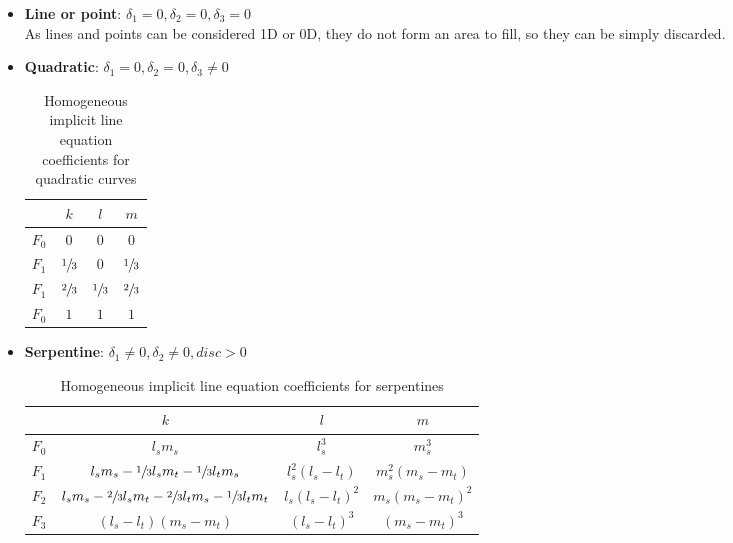 \documentclass[\topdir/main.tex]{subfiles}
\begin{document}
\begin{itemize}
    \item \textbf{Line or point}: $\delta_1 = 0, \delta_2 = 0, \delta_3 = 0$\\
        As lines and points can be considered 1D or 0D, they do not form an area to fill, so they can be simply discarded. 
    
    \item \textbf{Quadratic}: $\delta_1 = 0, \delta_2 = 0, \delta_3 \neq 0$\\
        \begin{table}[H]
            \centering
            \begin{tabular}{|l|c|c|c|}
                \hline
                \qquad&     $k$ &               $l$ &               $m$             \\\hline
                $F_0$ &     $0$ &               $0$ &               $0$             \\\hline
                $F_1$ &     $\sfrac{1}{3}$ &    $0$ &               $\sfrac{1}{3}$  \\\hline
                $F_1$ &     $\sfrac{2}{3}$ &    $\sfrac{1}{3}$ &    $\sfrac{2}{3}$  \\\hline
                $F_0$ &     $1$ &               $1$ &               $1$             \\\hline
            \end{tabular}
            \caption{Homogeneous implicit line equation coefficients for quadratic curves}
            \label{tab:blinnloop_klm_quadratic}
        \end{table}
    
    \item \textbf{Serpentine}: $\delta_1 \neq 0, \delta_2 \neq 0, disc > 0$
        \begin{table}[H]
            \centering
            \begin{tabular}{|l|c|c|c|}
                \hline
                \qquad&     $k$ &               $l$ &               $m$ \\\hline
                $F_0$ &     $l_s m_s$ &         $l_s^3$ &           $m_s^3$ \\\hline
                $F_1$ &     $l_s m_s - \sfrac{1}{3} l_s m_t - \sfrac{1}{3} l_t m_s$ &       
                            $l_s^2 (l_s - l_t)$ &         
                            $m_s^2 (m_s - m_t)$ \\\hline
                $F_2$ &     $l_s m_s - \sfrac{2}{3} l_s m_t - \sfrac{2}{3} l_t m_s - \sfrac{1}{3} l_t m_t$ &
                            $l_s (l_s - l_t)^2$ &
                            $m_s (m_s - m_t)^2$ \\\hline
                $F_3$ &     $(l_s - l_t) (m_s - m_t)$ &  
                            $(l_s - l_t)^3$ &  
                            $(m_s - m_t)^3$ \\\hline
            \end{tabular}
            \caption{Homogeneous implicit line equation coefficients for serpentines}
            \label{tab:blinnloop_klm_serpentine}
        \end{table}
        

\end{itemize}
\end{document}
